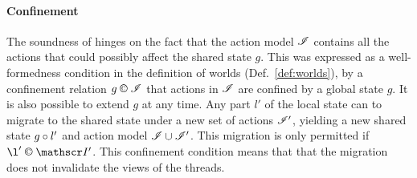 

\paragraph{Confinement}
The soundness of \colosl hinges on the fact that the action model
$\mathscr{I}$ contains all the actions that could possibly affect the shared
state $g$. This was expressed as a well-formedness condition in the
definition of worlds (Def.~\ref{def:worlds}), by a confinement
relation $g\confines \lmod$ that actions in $\mathscr{I}$ are confined by a
global state $g$. It is also possible to extend $g$ at any time.  Any
part $l'$ of the local state can to migrate to the shared state under
a new set of actions $\mathscr{I}'$, yielding a new shared state $g\circ
l'$ and action model $\mathscr{I} \cup \mathscr{I}'$. This migration is only
permitted if $\l ' \confines \lmod'$. This confinement condition means
that that the migration does not invalidate the views of the threads.


